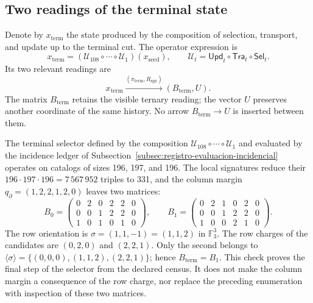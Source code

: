 

\subsection{Two readings of the terminal state}
\label{subsec:k-terminal}

Denote by \(x_{\mathrm{term}}\) the state produced by the composition
of selection, transport, and update up to the terminal cut. The
operator expression is
\[
 x_{\mathrm{term}}=
 (\mathcal U_{108}\circ\cdots\circ\mathcal U_1)(x_{\mathrm{seed}}),
 \qquad \mathcal U_t=\mathsf{Upd}_t\circ\mathsf{Tra}_t\circ\mathsf{Sel}_t.
\]
Its two relevant readings are
\[
 x_{\mathrm{term}}
 \xrightarrow{(\pi_{\mathrm{term}},R_{\mathrm{sgn}})}
 (B_{\mathrm{term}},U).
\]
The matrix \(B_{\mathrm{term}}\) retains the visible ternary reading; the
vector \(U\) preserves another coordinate of the same history. No arrow
\(B_{\mathrm{term}}\to U\) is inserted between them.

The terminal selector defined by the composition
\(\mathcal U_{108}\circ\cdots\circ\mathcal U_1\) and evaluated by the
incidence ledger of Subsection~\ref{subsec:registro-evaluacion-incidencial}
operates on catalogs of sizes 196, 197, and 196. The local signatures reduce their
\(196\cdot197\cdot196=7\,567\,952\) triples to 331, and the column
margin \(q_{\partial}=(1,2,2,1,2,0)\) leaves two matrices:
\[
 B_0=\begin{pmatrix}0&2&0&2&2&0\\0&0&1&2&2&0\\1&0&1&0&1&0\end{pmatrix},
 \qquad
 B_1=\begin{pmatrix}0&2&1&0&2&0\\0&0&1&2&2&0\\1&0&0&2&1&0\end{pmatrix}.
\]
The row orientation is \(\sigma=(1,1,-1)=(1,1,2)\) in
\(\mathbb F_3^3\). The row charges of the candidates are
\((0,2,0)\) and \((2,2,1)\). Only the second belongs to
\(\langle\sigma\rangle=\{(0,0,0),(1,1,2),(2,2,1)\}\); hence
\(B_{\mathrm{term}}=B_1\). This check proves the final step of the
selector from the declared census. It does not make the column margin
a consequence of the row charge, nor replace the preceding enumeration
with inspection of these two matrices.

